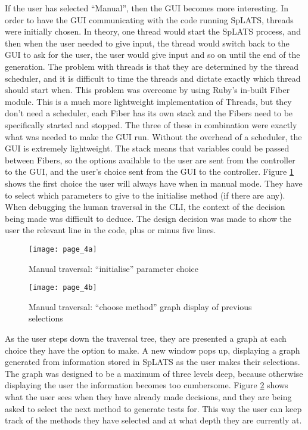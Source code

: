   If the user has selected ``Manual'', then the GUI becomes more interesting. In order to have the GUI communicating with the code running SpLATS, threads were initially chosen. In theory, one thread would start the SpLATS process, and then when the user needed to give input, the thread would switch back to the GUI to ask for the user, the user would give input and so on until the end of the generation. The problem with threads is that they are determined by the thread scheduler, and it is difficult to time the threads and dictate exactly which thread should start when. This problem was overcome by using Ruby's in-built Fiber module. This is a much more lightweight implementation of Threads, but they don't need a scheduler, each Fiber has its own stack and the Fibers need to be specifically started and stopped. The three of these in combination were exactly what was needed to make the GUI run. Without the overhead of a scheduler, the GUI is extremely lightweight. The stack means that variables could be passed between Fibers, so the options available to the user are sent from the controller to the GUI, and the user's choice sent from the GUI to the controller. Figure \ref{fig:GUI_Page4a} shows the first choice the user will always have when in manual mode. They have to select which parameters to give to the initialise method (if there are any). When debugging the human traversal in the CLI, the context of the decision being made was difficult to deduce. The design decision was made to show the user the relevant line in the code, plus or minus five lines.
  
  \begin{figure}
    \centering
    \texttt{[image: page\_4a]}
    \caption{Manual traversal: ``initialise'' parameter choice}
    \label{fig:GUI_Page4a}
  \end{figure}
  
  \begin{figure}
    \centering
    \texttt{[image: page\_4b]}
    \caption{Manual traversal: ``choose method'' graph display of previous selections}
    \label{fig:GUI_Page4b}
  \end{figure}
  
  As the user steps down the traversal tree, they are presented a graph at each choice they have the option to make. A new window pops up, displaying a graph generated from information stored in SpLATS as the user makes their selections. The graph was designed to be a maximum of three levels deep, because otherwise displaying the user the information becomes too cumbersome. Figure \ref{fig:GUI_Page4b} shows what the user sees when they have already made decisions, and they are being asked to select the next method to generate tests for. This way the user can keep track of the methods they have selected and at what depth they are currently at.

